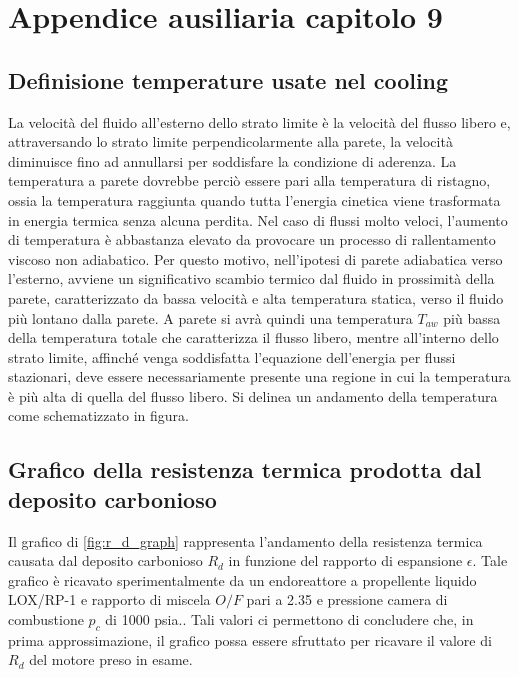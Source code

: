 \section{Appendice ausiliaria capitolo 9}
\label{appendix:cooling_temp_definitions}

\subsection{Definisione temperature usate nel cooling}

La velocità del fluido all'esterno dello strato limite è la velocità del flusso libero e, attraversando lo strato limite perpendicolarmente alla parete, la velocità diminuisce fino ad annullarsi per soddisfare la condizione di aderenza. La temperatura a parete dovrebbe perciò essere pari alla temperatura di ristagno, ossia la temperatura raggiunta quando tutta l'energia cinetica viene trasformata in energia termica senza alcuna perdita. Nel caso di flussi molto veloci, l'aumento di temperatura è abbastanza elevato da provocare un processo di rallentamento viscoso non adiabatico. Per questo motivo, nell'ipotesi di parete adiabatica verso l'esterno, avviene un significativo scambio termico dal fluido in prossimità della parete, caratterizzato da bassa velocità e alta temperatura statica, verso il fluido più lontano dalla parete. A parete si avrà quindi una temperatura $T_{aw}$ più bassa della temperatura totale che caratterizza il flusso libero, mentre all'interno dello strato limite, affinché venga soddisfatta l'equazione dell'energia per flussi stazionari, deve essere necessariamente presente una regione in cui la temperatura è più alta di quella del flusso libero. Si delinea un andamento della temperatura come schematizzato in figura.
\vspace{20pt}

\subsection{Grafico della resistenza termica prodotta dal deposito carbonioso}
Il grafico di \autoref{fig:r_d_graph} rappresenta l'andamento della resistenza termica causata dal deposito carbonioso $R_d$ in funzione del rapporto di espansione $\epsilon$. Tale grafico è ricavato sperimentalmente da un endoreattore a propellente liquido LOX/RP-1 e rapporto di miscela $O/F$ pari a 2.35 e pressione camera di combustione $p_c$ di 1000 psia.\cite{AIAA_book_2}. Tali valori ci permettono di concludere che, in prima approssimazione, il grafico possa essere sfruttato per ricavare il valore di $R_d$ del motore preso in esame. 
\\
\\
\\
\\
\\
\\
\\
\\
\\
\\
\\
\\
\\
